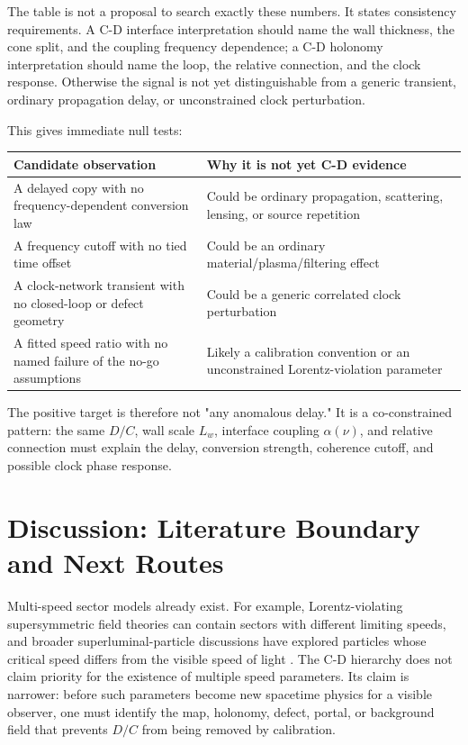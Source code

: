 \documentclass[11pt]{article}
\begin{document}
The table is not a proposal to search exactly these numbers. It states consistency requirements. A C-D interface interpretation should name the wall thickness, the cone split, and the coupling frequency dependence; a C-D holonomy interpretation should name the loop, the relative connection, and the clock response. Otherwise the signal is not yet distinguishable from a generic transient, ordinary propagation delay, or unconstrained clock perturbation.


This gives immediate null tests:


\begin{center}
\small
\begin{tabularx}{\textwidth}{@{}>{\raggedright\arraybackslash}X >{\raggedright\arraybackslash}X@{}}
\toprule
Candidate observation & Why it is not yet C-D evidence \\
\midrule
A delayed copy with no frequency-dependent conversion law & Could be ordinary propagation, scattering, lensing, or source repetition \\
A frequency cutoff with no tied time offset & Could be an ordinary material/plasma/filtering effect \\
A clock-network transient with no closed-loop or defect geometry & Could be a generic correlated clock perturbation \\
A fitted speed ratio with no named failure of the no-go assumptions & Likely a calibration convention or an unconstrained Lorentz-violation parameter \\
\bottomrule
\end{tabularx}
\end{center}


The positive target is therefore not "any anomalous delay." It is a co-constrained pattern: the same \(D/C\), wall scale \(L_w\), interface coupling \(\alpha(\nu)\), and relative connection must explain the delay, conversion strength, coherence cutoff, and possible clock phase response.


\section{Discussion: Literature Boundary and Next Routes}


Multi-speed sector models already exist. For example, Lorentz-violating supersymmetric field theories can contain sectors with different limiting speeds, and broader superluminal-particle discussions have explored particles whose critical speed differs from the visible speed of light \citep{Redigolo2012LorentzViolatingSUSY,ChashchinaSilagadze2012LightSpeedBarrier}. The C-D hierarchy does not claim priority for the existence of multiple speed parameters. Its claim is narrower: before such parameters become new spacetime physics for a visible observer, one must identify the map, holonomy, defect, portal, or background field that prevents \(D/C\) from being removed by calibration.
\end{document}
